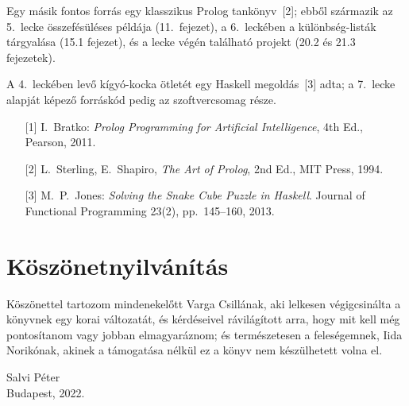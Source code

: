 Egy másik fontos forrás egy klasszikus Prolog tankönyv~[2]; ebből
származik az 5.~lecke összefésüléses példája (11.~fejezet), a
6.~leckében a különbség-listák tárgyalása (15.1 fejezet), és a
lecke végén található projekt (20.2 és 21.3 fejezetek).

A 4.~leckében levő kígyó-kocka ötletét egy Haskell megoldás~[3] adta;
a 7.~lecke alapját képező forráskód pedig az 
szoftvercsomag része.

\begin{itemize}[leftmargin=2cm,itemindent=-1cm,labelsep=1cm-2em]
\item[{[1]}] I.~Bratko: \emph{Prolog Programming for Artificial
Intelligence}, 4th Ed., Pearson, 2011.
\item[{[2]}] L.~Sterling, E.~Shapiro, \emph{The Art of Prolog}, 2nd
  Ed., MIT Press, 1994.
\item[{[3]}] M.~P.~Jones: \emph{Solving the Snake Cube Puzzle in Haskell}.
  Journal of Functional Programming 23(2), pp.~145--160, 2013.
\end{itemize}

\section*{Köszönetnyilvánítás}
Köszönettel tartozom mindenekelőtt Varga Csillának, aki lelkesen
végigcsinálta a könyvnek egy korai változatát, és kérdéseivel
rávilágított arra, hogy mit kell még pontosítanom vagy jobban
elmagyaráznom; és természetesen a feleségemnek, Iida Norikónak, akinek
a támogatása nélkül ez a könyv nem készülhetett volna el.

\begin{flushright}
  Salvi Péter\\
  Budapest, 2022.
\end{flushright}
